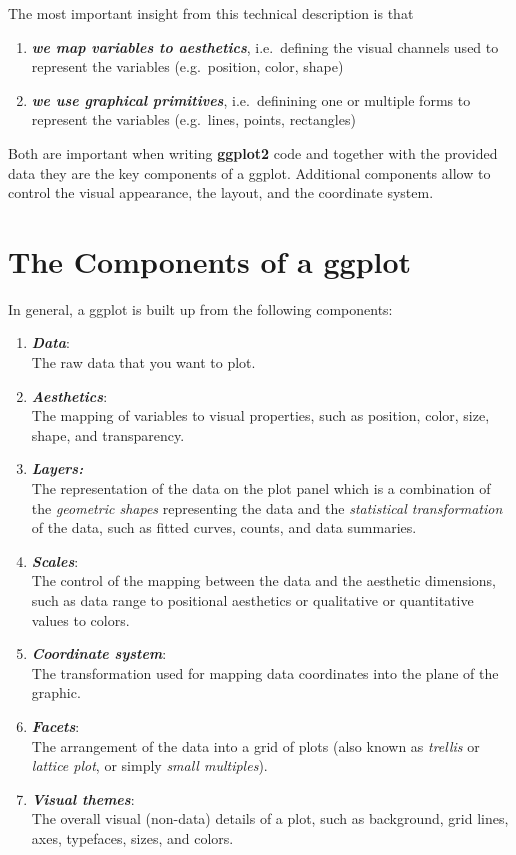 \documentclass[
]{krantz}
\providecommand{\tightlist}{%
  \setlength{\itemsep}{0pt}\setlength{\parskip}{0pt}}
\begin{document}
The most important insight from this technical description is that

\begin{enumerate}
\def\labelenumi{\arabic{enumi}.}
\tightlist
\item
  \textbf{\emph{we map variables to aesthetics}}, i.e.~defining the visual channels used to represent the variables (e.g.~position, color, shape)
\item
  \textbf{\emph{we use graphical primitives}}, i.e.~definining one or multiple forms to represent the variables (e.g.~lines, points, rectangles)
\end{enumerate}

Both are important when writing \textbf{ggplot2} code and together with the provided data they are the key components of a ggplot. Additional components allow to control the visual appearance, the layout, and the coordinate system.

\hypertarget{components}{%
\section{The Components of a ggplot}\label{components}}

In general, a ggplot is built up from the following components:

\begin{enumerate}
\def\labelenumi{\arabic{enumi}.}
\tightlist
\item
  \textbf{\emph{Data}}:\\
  The raw data that you want to plot.
\item
  \textbf{\emph{Aesthetics}}:\\
  The mapping of variables to visual properties, such as position, color, size, shape, and transparency.
\item
  \textbf{\emph{Layers:}}\\
  The representation of the data on the plot panel which is a combination of the \emph{geometric shapes} representing the data and the \emph{statistical transformation} of the data, such as fitted curves, counts, and data summaries.
\item
  \textbf{\emph{Scales}}:\\
  The control of the mapping between the data and the aesthetic dimensions, such as data range to positional aesthetics or qualitative or quantitative values to colors.
\item
  \textbf{\emph{Coordinate system}}:\\
  The transformation used for mapping data coordinates into the plane of the graphic.
\item
  \textbf{\emph{Facets}}:\\
  The arrangement of the data into a grid of plots (also known as \emph{trellis} or \emph{lattice plot}, or simply \emph{small multiples}).
\item
  \textbf{\emph{Visual themes}}:\\
  The overall visual (non-data) details of a plot, such as background, grid lines, axes, typefaces, sizes, and colors.
\end{enumerate}
\end{document}
